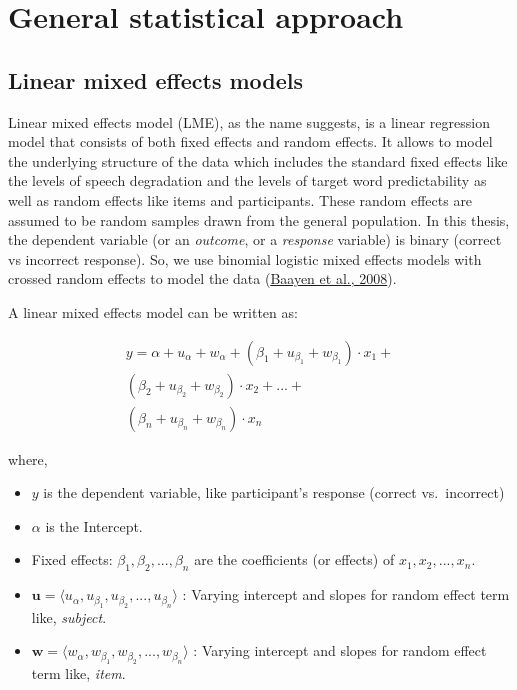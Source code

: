 \documentclass[a4paper, nobind]{templates/ociamthesis}
\providecommand{\tightlist}{%
  \setlength{\itemsep}{0pt}\setlength{\parskip}{0pt}}
\renewcommand{\chaptermark}[1]{\markboth{\thechapter. #1}{\thechapter. #1}}
\begin{document}
\hypertarget{chapter-stats}{%
\chapter{General statistical approach}\label{chapter-stats}}

\chaptermark{Statistics}

\hypertarget{linear-mixed-effects-models}{%
\section{Linear mixed effects models}\label{linear-mixed-effects-models}}

Linear mixed effects model (LME), as the name suggests, is a linear regression model that consists of both fixed effects and random effects.
It allows to model the underlying structure of the data which includes
the standard fixed effects like the levels of speech degradation and the levels of target word predictability
as well as random effects like items and participants.
These random effects are assumed to be random samples drawn from the general population.
In this thesis, the dependent variable (or an \emph{outcome}, or a \emph{response} variable) is binary (correct vs incorrect response).
So, we use binomial logistic mixed effects models with crossed random effects to model the data (\protect\hyperlink{ref-Baayen2008}{Baayen et al., 2008}).

A linear mixed effects model can be written as:

\begin{align} \label{eq:mixed-effects1}
y = \alpha + u_{\alpha} + w_{\alpha} +
    (\beta_{1} + u_{\beta_{1}} + w_{\beta_{1}})\cdot {x_1} + \nonumber\\
    (\beta_{2} + u_{\beta_{2}} + w_{\beta_{2}})\cdot {x_2} + ... + \nonumber\\
    (\beta_{n} + u_{\beta_{n}} + w_{\beta_{n}})\cdot {x_n} 
\end{align}

where,

\begin{itemize}
\tightlist
\item
  \(y\) is the dependent variable, like participant's response (correct vs.~incorrect)
\item
  \(\alpha\) is the Intercept.
\item
  Fixed effects: \(\beta_{1}, \beta_{2}, ..., \beta_{n}\) are the coefficients (or effects) of \(x_1, x_2, ...,x_n\).
\item
  \(\boldsymbol{u} = \langle u_{\alpha}, u_{\beta_1}, u_{\beta_2}, ..., u_{\beta_n} \rangle\) : Varying intercept and slopes for random effect term like, \emph{subject}.
\item
  \(\boldsymbol{w} = \langle w_{\alpha}, w_{\beta_1}, w_{\beta_2}, ..., w_{\beta_n} \rangle\) : Varying intercept and slopes for random effect term like, \emph{item}.
\end{itemize}
\end{document}
